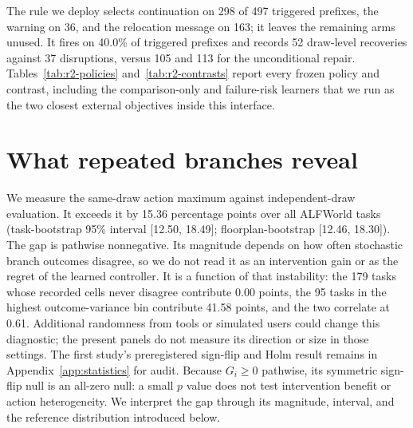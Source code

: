 The rule we deploy selects continuation on 298 of 497 triggered prefixes, the warning on 36, and the relocation message on 163; it leaves the remaining arms unused. It fires on 40.0\% of triggered prefixes and records 52 draw-level recoveries against 37 disruptions, versus 105 and 113 for the unconditional repair. Tables~\ref{tab:r2-policies} and~\ref{tab:r2-contrasts} report every frozen policy and contrast, including the comparison-only and failure-risk learners that we run as the two closest external objectives inside this interface.


\section{What repeated branches reveal}
\label{sec:analysis}
We measure the same-draw action maximum against independent-draw evaluation. It exceeds it by 15.36 percentage points over all ALFWorld tasks (task-bootstrap 95\% interval [12.50, 18.49]; floorplan-bootstrap [12.46, 18.30]). The gap is pathwise nonnegative. Its magnitude depends on how often stochastic branch outcomes disagree, so we do not read it as an intervention gain or as the regret of the learned controller. It is a function of that instability: the 179 tasks whose recorded cells never disagree contribute 0.00 points, the 95 tasks in the highest outcome-variance bin contribute 41.58 points, and the two correlate at 0.61. Additional randomness from tools or simulated users could change this diagnostic; the present panels do not measure its direction or size in those settings. The first study's preregistered sign-flip and Holm result remains in Appendix~\ref{app:statistics} for audit. Because $G_i\geq0$ pathwise, its symmetric sign-flip null is an all-zero null: a small $p$ value does not test intervention benefit or action heterogeneity. We interpret the gap through its magnitude, interval, and the reference distribution introduced below.


